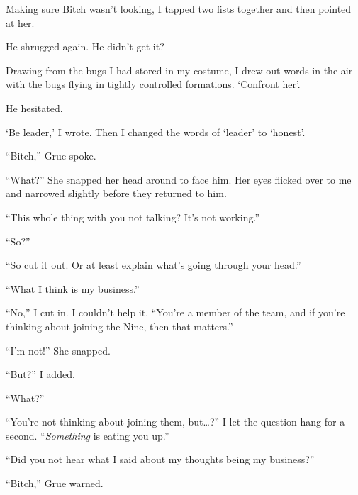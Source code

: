Making sure Bitch wasn't looking, I tapped two fists together and then pointed at her.



He shrugged again.  He didn't get it?



Drawing from the bugs I had stored in my costume, I drew out words in the air with the bugs flying in tightly controlled formations.  `Confront her'.



He hesitated.



`Be leader,' I wrote.  Then I changed the words of `leader' to `honest'.



``Bitch,'' Grue spoke.



``What?''  She snapped her head around to face him.  Her eyes flicked over to me and narrowed slightly before they returned to him.



``This whole thing with you not talking?  It's not working.''



``So?''



``So cut it out.  Or at least explain what's going through your head.''



``What I think is my business.''



``No,'' I cut in.  I couldn't help it.  ``You're a member of the team, and if you're thinking about joining the Nine, then that matters.''



``I'm not!''  She snapped.



``But?'' I added.



``What?''



``You're not thinking about joining them, but\ldots?'' I let the question hang for a second.  ``\emph{Something} is eating you up.''



``Did you not hear what I said about my thoughts being my business?''



``Bitch,'' Grue warned.



